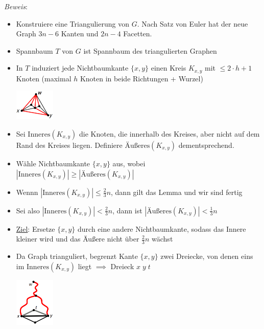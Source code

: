 \textit{Beweis}: 
\begin{itemize}
	\item Konstruiere eine Triangulierung von $G$. Nach Satz von Euler hat der neue Graph $3n-6$ Kanten und $2n-4$ Facetten.
	\item Spannbaum $T$ von $G$ ist Spannbaum des triangulierten Graphen
	\item In $T$ induziert jede Nichtbaumkante $\{x,y\}$ einen Kreis $K_{x,y}$ mit $\leq 2\cdot h+1$ Knoten (maximal $h$ Knoten in beide Richtungen + Wurzel)
	\begin{center}
		\includegraphics[width=0.15\textwidth]{images/pst-1.png}
	\end{center}
	\item Sei $\text{Inneres}(K_{x,y})$ die Knoten, die innerhalb des Kreises, aber nicht auf dem Rand des Kreises liegen. Definiere $\text{Äußeres}(K_{x,y})$ dementsprechend.
	\item Wähle Nichtbaumkante $\{x,y\}$ aus, wobei $|\text{Inneres}(K_{x,y})|\geq|\text{Äußeres}(K_{x,y})|$
	\item Wennn $|\text{Inneres}(K_{x,y})| \leq \frac{2}{3}n$, dann gilt das Lemma und wir sind fertig
	\item Sei also  $|\text{Inneres}(K_{x,y})|<\frac{2}{3}n$, dann ist $|\text{Äußeres}(K_{x,y})|<\frac{1}{3}n$
	\item \underline{Ziel}: Ersetze $\{x,y\}$ durch eine andere Nichtbaumkante, sodass das Innere kleiner wird und das Äußere nicht über $\frac{2}{3}n$ wächst
	\item Da Graph trianguliert, begrenzt Kante $\{x,y\}$ zwei Dreiecke, von denen eins im $\text{Inneres}(K_{x,y})$ liegt $\implies$ Dreieck $x\;y\;t$
	\begin{center}
		\includegraphics[width=0.15\textwidth]{images/pst-2.png}
	\end{center}
\end{itemize}

